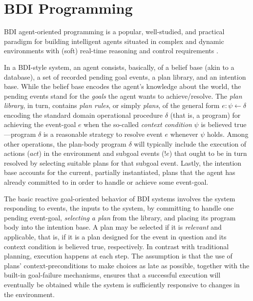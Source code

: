 \section{BDI Programming}\label{sec:preliminaries}

BDI agent-oriented programming is a popular, well-studied, and practical paradigm
for building intelligent agents situated in complex and dynamic environments with
(soft) real-time reasoning and control requirements
\cite{Georgeff89-PRS,Benfield:AAMAS06}.

In a BDI-style system, an agent consists, basically, of a belief base (akin to a
database), a set of recorded pending goal events, a plan library, and an
intention base. While the belief base encodes the agent's knowledge about the
world, the pending events stand for the \emph{goals} the agent wants to
achieve/resolve.
The \textit{plan library}, in turn, contains \emph{plan rules}, or simply
\emph{plans}, of the general form $e: \psi \leftarrow \delta$ encoding the
standard domain operational procedure $\delta$ (that is, a program) for achieving
the event-goal $e$ when the so-called \textit{context condition} $\psi$ is
believed true---program $\delta$ is a reasonable strategy to resolve event $e$
whenever $\psi$ holds. Among other operations, the plan-body program $\delta$
will typically include the execution of actions ($act$) in the environment and
subgoal events ($!e$) that ought to be in turn resolved by selecting suitable
plans for that subgoal event. Lastly, the intention base accounts for the
current, partially instantiated, plans that the agent has already committed to in
order to handle or achieve some event-goal.


The basic reactive goal-oriented behavior of BDI systems involves the system
responding to events, the inputs to the system, by committing to handle one
pending event-goal, \textit{selecting a plan} from the library, and placing its
program body  into the intention base.
A plan may be selected if it is \textit{relevant} and applicable, that is, if it
is a plan designed for the event in question and its context condition is
believed true, respectively.
In contrast with traditional planning, execution happens at each step. The
assumption is that the use of plans' context-preconditions to make choices as
late as possible, together with the built-in goal-failure mechanisms, ensures
that a successful execution will eventually be obtained while the system is
sufficiently responsive to changes in the environment.


